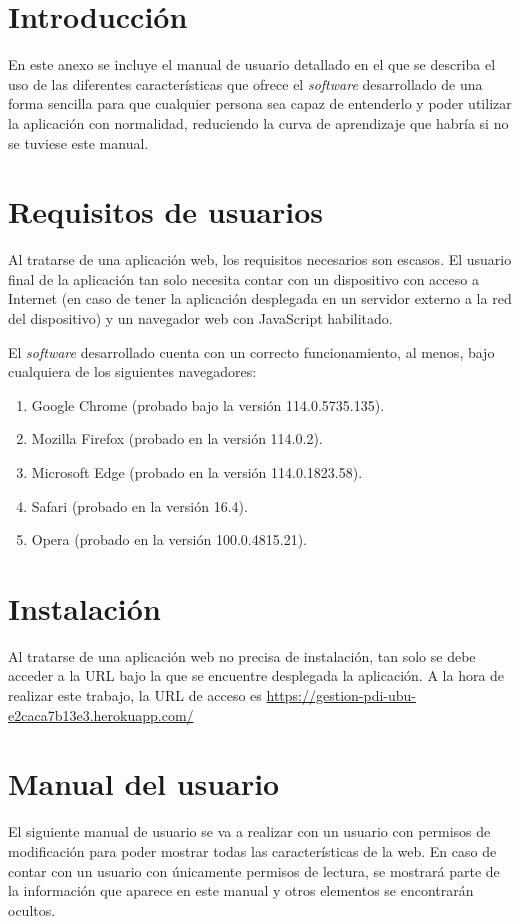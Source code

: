 
\section{Introducción}
En este anexo se incluye el manual de usuario detallado en el que se describa el uso de las diferentes características que ofrece el \textit{software} desarrollado de una forma sencilla para que cualquier persona sea capaz de entenderlo y poder utilizar la aplicación con normalidad, reduciendo la curva de aprendizaje que habría si no se tuviese este manual.

\section{Requisitos de usuarios}
Al tratarse de una aplicación web, los requisitos necesarios son escasos.
El usuario final de la aplicación tan solo necesita contar con un dispositivo con acceso a Internet (en caso de tener la aplicación desplegada en un servidor externo a la red del dispositivo) y un navegador web con JavaScript habilitado.

El \textit{software} desarrollado cuenta con un correcto funcionamiento, al menos, bajo cualquiera de los siguientes navegadores:

\begin{enumerate}
\item Google Chrome (probado bajo la versión 114.0.5735.135).
\item Mozilla Firefox (probado en la versión 114.0.2).
\item Microsoft Edge (probado en la versión 114.0.1823.58).
\item Safari (probado en la versión 16.4).
\item Opera (probado en la versión 100.0.4815.21).
\end{enumerate}

\section{Instalación}
Al tratarse de una aplicación web no precisa de instalación, tan solo se debe acceder a la URL bajo la que se encuentre desplegada la aplicación. 
A la hora de realizar este trabajo, la URL de acceso es \url{https://gestion-pdi-ubu-e2caca7b13e3.herokuapp.com/}

\section{Manual del usuario}
El siguiente manual de usuario se va a realizar con un usuario con permisos de modificación para poder mostrar todas las características de la web.
En caso de contar con un usuario con únicamente permisos de lectura, se mostrará parte de la información que aparece en este manual y otros elementos se encontrarán ocultos.

